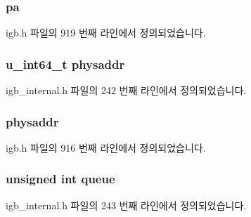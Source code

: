 \subsubsection[{\texorpdfstring{pa}{pa}}]{ pa}\hypertarget{structigb__buf__cmd_a16daee3847fb6e540a1285a3951ff169}{}\label{structigb__buf__cmd_a16daee3847fb6e540a1285a3951ff169}


igb.\+h 파일의 919 번째 라인에서 정의되었습니다.

\subsubsection[{\texorpdfstring{physaddr}{physaddr}}]{\setlength{\rightskip}{0pt plus 5cm}u\+\_\+int64\+\_\+t physaddr}\hypertarget{structigb__buf__cmd_a23da577f8e1a9164fc9c47cf626ae945}{}\label{structigb__buf__cmd_a23da577f8e1a9164fc9c47cf626ae945}


igb\+\_\+internal.\+h 파일의 242 번째 라인에서 정의되었습니다.

\subsubsection[{\texorpdfstring{physaddr}{physaddr}}]{ physaddr}\hypertarget{structigb__buf__cmd_a49f357a5ff181876b6c641e455b18b20}{}\label{structigb__buf__cmd_a49f357a5ff181876b6c641e455b18b20}


igb.\+h 파일의 916 번째 라인에서 정의되었습니다.

\subsubsection[{\texorpdfstring{queue}{queue}}]{\setlength{\rightskip}{0pt plus 5cm}unsigned int queue}\hypertarget{structigb__buf__cmd_a333f8c12f7257468eb143bdd69f6ae80}{}\label{structigb__buf__cmd_a333f8c12f7257468eb143bdd69f6ae80}


igb\+\_\+internal.\+h 파일의 243 번째 라인에서 정의되었습니다.


